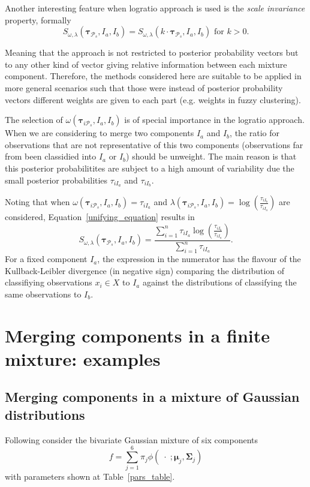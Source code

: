 \documentclass[10pt, a4paper]{article}
\theoremstyle{definition}
\newcommand{\m}[1]{\boldsymbol{#1}}
\begin{document}
\begin{spacing}{1.9}
Another interesting feature when logratio approach is used is the \emph{scale invariance} property, formally
\[
S_{\omega, \lambda}( \m\tau_{\mathcal{P}_s},  I_a,  I_b) = S_{\omega, \lambda}(k\cdot \m\tau_{\mathcal{P}_s},  I_a,  I_b) \text{ for $k>0$.}
\] 

Meaning that the approach is not restricted to posterior probability vectors but to any other kind of vector giving relative information between each mixture component. Therefore, the methods considered here are suitable to be applied in more general scenarios such that those were instead of posterior probability vectors different weights are given to each part (e.g. weights in fuzzy clustering).

The selection of $\omega(\m\tau_{i \mathcal{P}_s},  I_a,  I_b)$ is of special importance in the logratio approach. When we are considering to merge two components $I_a$ and $I_b$, the ratio for observations that are not representative of this two components (observations far from been classidied into $I_a$ or $I_b$) should be unweight. The main reason is that this posterior probabilitites are subject to a high amount of variability due the small posterior probabilities $\tau_{iI_a}$ and $\tau_{iI_b}$.

Noting that when $\omega(\m\tau_{i \mathcal{P}_s},  I_a,  I_b) =  \tau_{iI_a}$ and $\lambda(\m\tau_{i \mathcal{P}_s},  I_a,  I_b) = \log \left(\frac{ \tau_{iI_b} }{ \tau_{iI_a} }\right)$ are considered, Equation~\ref{unifying_equation} results in
\[
S_{\omega, \lambda}( \m\tau_{\mathcal{P}_s},  I_a,  I_b) = \frac{\sum_{i=1}^n\tau_{iI_a}  \log \left(\frac{ \tau_{iI_b} }{ \tau_{iI_a} }\right)}{\sum_{i=1}^n \tau_{iI_a}}.
\]
For a fixed component $I_a$, the expression in the numerator has the flavour of the Kullback-Leibler divergence (in negative sign) comparing the distribution of classifiying observations $x_i \in X$ to $I_a$ against the distributions of classifying the same observations to $I_b$.

\section{Merging components in a finite mixture: examples}\label{merging_examples_dist}

\subsection{Merging components in a mixture of Gaussian distributions}

Following \cite{baudry2010combining} consider the bivariate Gaussian mixture of six components
\[
f= \sum_{j=1}^6 \pi_j \phi(\;\cdot\; ;  \m\mu_j, \m\Sigma_j)
\]
with parameters shown at Table~\ref{pars_table}. 


\end{spacing}
\end{document}
